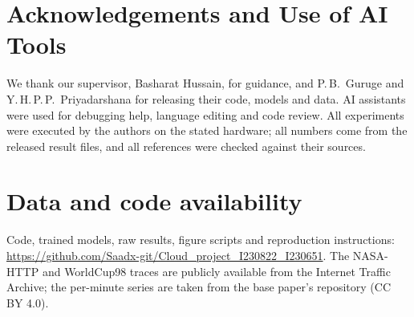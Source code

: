 \documentclass[conference,a4paper]{IEEEtran}
\begin{document}
\section*{Acknowledgements and Use of AI Tools}
We thank our supervisor, Basharat Hussain, for guidance, and P.\,B.\ Guruge and Y.\,H.\,P.\,P.\
Priyadarshana for releasing their code, models and data. AI assistants were used for debugging help, language
editing and code review. All experiments were executed by
the authors on the stated hardware; all numbers come from the released result files, and all references were
checked against their sources.

\section*{Data and code availability}
Code, trained models, raw results, figure scripts and reproduction instructions:
\url{https://github.com/Saadx-git/Cloud_project_I230822_I230651}. The NASA-HTTP and WorldCup98 traces are
publicly available from the Internet Traffic Archive; the per-minute series are taken from the base paper's
repository (CC BY 4.0).
\end{document}
